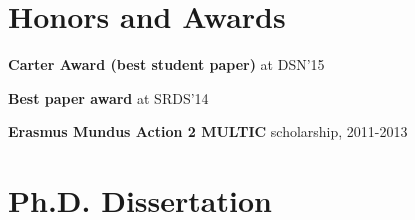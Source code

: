 \documentclass[letterpaper]{article}
\renewenvironment{itemize}{
  \begin{list}{}{
    \setlength{\leftmargin}{1.5em}
  }
}{
  \end{list}
}
\begin{document}
\section*{Honors and Awards}

\begin{itemize}
\item \textbf{Carter Award (best student paper)} at DSN'15
\item \textbf{Best paper award} at SRDS'14
\item \textbf{Erasmus Mundus Action 2 MULTIC} scholarship, 2011-2013

\end{itemize}


\section* {Ph.D. Dissertation}
\end{document}
